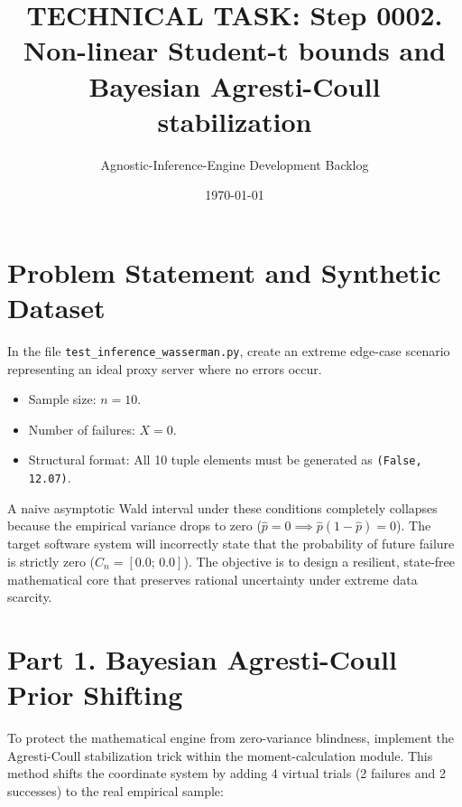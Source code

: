 \documentclass[12pt,a4paper]{article}
\begin{document}
\title{\textbf{TECHNICAL TASK: Step 0002. Non-linear Student-t bounds and Bayesian Agresti-Coull stabilization}}
\author{Agnostic-Inference-Engine Development Backlog}
\date{\today}
\maketitle

\section{Problem Statement and Synthetic Dataset}
In the file \texttt{test\_inference\_wasserman.py}, create an extreme edge-case scenario representing an ideal proxy server where no errors occur.
\begin{itemize}
    \item Sample size: $n = 10$.
    \item Number of failures: $X = 0$.
    \item Structural format: All 10 tuple elements must be generated as \texttt{(False, 12.07)}.
\end{itemize}

A naive asymptotic Wald interval under these conditions completely collapses because the empirical variance drops to zero ($\hat{p} = 0 \implies \hat{p}(1-\hat{p}) = 0$). The target software system will incorrectly state that the probability of future failure is strictly zero ($C_n = [0.0; \, 0.0]$). The objective is to design a resilient, state-free mathematical core that preserves rational uncertainty under extreme data scarcity.

\section{Part 1. Bayesian Agresti-Coull Prior Shifting}
To protect the mathematical engine from zero-variance blindness, implement the Agresti-Coull stabilization trick within the moment-calculation module. This method shifts the coordinate system by adding 4 virtual trials (2 failures and 2 successes) to the real empirical sample:
\end{document}
